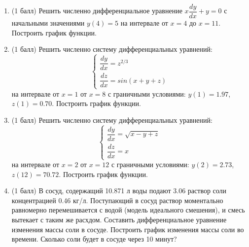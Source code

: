\begin{enumerate}
\item (1 балл) Решить численно дифференциальное уравнение $x\dfrac{dy}{dx}+y=0                   $ с начальными значениями $y(     4)=     5$ на интервале от $x=     4$ до $x=    11$. Построить график функции.\item (1 балл) Решить численно систему дифференциальных уравнений:
 \begin{equation*}
\left\{
\begin{gathered}
\dfrac{dy}{dx}=z^{2/3}               \\
\dfrac{dz}{dx}=sin(x+y+z)            
\end{gathered}
\right.
\end{equation*}
на интервале от $x= 1$ от $x= 8$ с граничными условиями: $y( 1)=1.97$, $z( 1)=0.70$. Построить график функции. 
\item (1 балл) Решить численно систему дифференциальных уравнений:
 \begin{equation*}
\left\{
\begin{gathered}
\dfrac{dy}{dx}=\sqrt{x-y+z}\\
\dfrac{dz}{dx}=x
\end{gathered}
\right.
\end{equation*}
на интервале от $x= 2$ от $x=12$ с граничными условиями: $y( 2)=2.73$, $z(12)=70.72$.  Построить график функции. 
\item (1 балл)  В сосуд, содержащий 10.871 л воды подают 3.06 раствор соли концентрацией 0.46 кг/л. Поступающий в сосуд раствор моментально равномерно перемешивается с водой (модель идеального смешения), и смесь вытекает с таким же расхдом. Составить дифференциальное уравнение изменения массы соли в сосуде. Построить график изменения массы соли во времени. Сколько соли будет в сосуде через  10 минут?

\end{enumerate}
